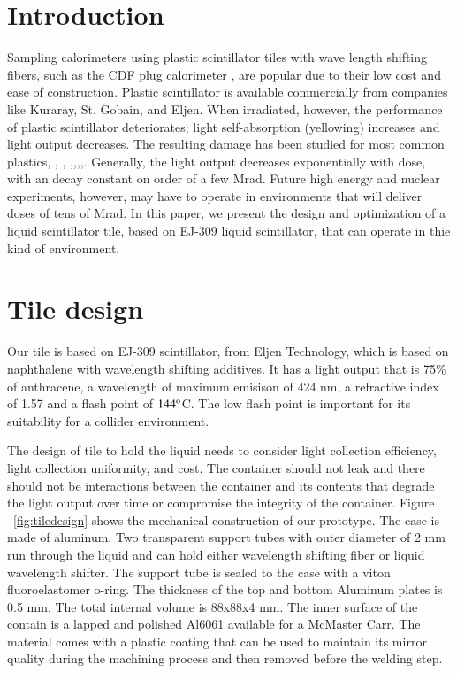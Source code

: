 \documentclass[review]{elsarticle}
\begin{document}
\section{Introduction}
Sampling calorimeters using plastic scintillator tiles with wave length shifting fibers, such as the CDF plug calorimeter \cite{Albrow20022524}, are popular due to their low cost and ease of construction.  Plastic scintillator is available commercially from companies like Kuraray, St. Gobain, and Eljen.  When irradiated, however, the performance of plastic scintillator deteriorates; light self-absorption (yellowing) increases and light output decreases.  The resulting damage has been studied for most common plastics\cite{34504}, \cite{Wick1991472}, \cite{289295},
\cite{173180},\cite{467829},\cite{Wulkop1995141},\cite{173178},\cite{vasken}.  Generally, the light output decreases exponentially with dose, with an decay constant on order of a few Mrad.  Future high energy and nuclear experiments, however, may have to operate in environments that will deliver doses of tens of Mrad.  In this paper, we present the design and optimization of a liquid scintillator tile, based on EJ-309 liquid scintillator, that can operate in thie kind of environment.


\section{Tile design}

Our tile is based on EJ-309 scintillator, from Eljen Technology, which is based on naphthalene with wavelength shifting additives.  It has a light output that is 75\% of anthracene, a wavelength of maximum emisison of 424 nm, a refractive index of 1.57 and a flash point of $\rm{144^o}$C.  The low flash point is important for its suitability for a collider environment.

The design of tile to hold the liquid needs to consider light collection efficiency, light collection uniformity, and cost.  The container should not leak and there should not be interactions between the container and its contents that degrade the light output over time or compromise the integrity
of the container.
Figure ~\ref{fig:tiledesign} shows the mechanical construction of our prototype.  The case is made of aluminum.  Two transparent support tubes with outer diameter of 2 mm run through the liquid and can hold either wavelength shifting fiber or liquid wavelength shifter.  The support tube is sealed to the case with a viton fluoroelastomer o-ring.  The thickness of the top and bottom Aluminum plates is 0.5 mm.  The total internal volume is 88x88x4 mm. The inner surface of the contain
is a lapped and polished Al6061 available for a McMaster Carr. The material comes with a plastic coating that can be 
used to maintain its mirror quality during the machining process and then removed before the welding step. 
\end{document}
